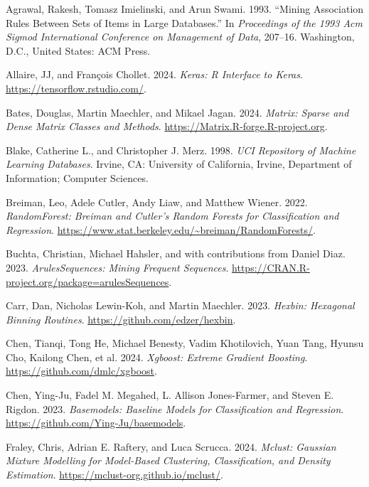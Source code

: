 \documentclass[
  notitlepage]{book}
\newlength{\cslhangindent}
\newenvironment{cslreferences}%
  {\setlength{\parindent}{0pt}%
  \everypar{\setlength{\hangindent}{\cslhangindent}}\ignorespaces}%
  {\par}
\begin{document}
\hypertarget{refs}{}
\begin{cslreferences}
\leavevmode\hypertarget{ref-arules:Agrawal+Imielinski+Swami:1993}{}%
Agrawal, Rakesh, Tomasz Imielinski, and Arun Swami. 1993. ``Mining Association Rules Between Sets of Items in Large Databases.'' In \emph{Proceedings of the 1993 Acm Sigmod International Conference on Management of Data}, 207--16. Washington, D.C., United States: ACM Press.

\leavevmode\hypertarget{ref-R-keras}{}%
Allaire, JJ, and François Chollet. 2024. \emph{Keras: R Interface to Keras}. \url{https://tensorflow.rstudio.com/}.

\leavevmode\hypertarget{ref-R-Matrix}{}%
Bates, Douglas, Martin Maechler, and Mikael Jagan. 2024. \emph{Matrix: Sparse and Dense Matrix Classes and Methods}. \url{https://Matrix.R-forge.R-project.org}.

\leavevmode\hypertarget{ref-mlbench1998}{}%
Blake, Catherine L., and Christopher J. Merz. 1998. \emph{UCI Repository of Machine Learning Databases}. Irvine, CA: University of California, Irvine, Department of Information; Computer Sciences.

\leavevmode\hypertarget{ref-R-randomForest}{}%
Breiman, Leo, Adele Cutler, Andy Liaw, and Matthew Wiener. 2022. \emph{RandomForest: Breiman and Cutler's Random Forests for Classification and Regression}. \url{https://www.stat.berkeley.edu/~breiman/RandomForests/}.

\leavevmode\hypertarget{ref-R-arulesSequences}{}%
Buchta, Christian, Michael Hahsler, and with contributions from Daniel Diaz. 2023. \emph{ArulesSequences: Mining Frequent Sequences}. \url{https://CRAN.R-project.org/package=arulesSequences}.

\leavevmode\hypertarget{ref-R-hexbin}{}%
Carr, Dan, Nicholas Lewin-Koh, and Martin Maechler. 2023. \emph{Hexbin: Hexagonal Binning Routines}. \url{https://github.com/edzer/hexbin}.

\leavevmode\hypertarget{ref-R-xgboost}{}%
Chen, Tianqi, Tong He, Michael Benesty, Vadim Khotilovich, Yuan Tang, Hyunsu Cho, Kailong Chen, et al. 2024. \emph{Xgboost: Extreme Gradient Boosting}. \url{https://github.com/dmlc/xgboost}.

\leavevmode\hypertarget{ref-R-basemodels}{}%
Chen, Ying-Ju, Fadel M. Megahed, L. Allison Jones-Farmer, and Steven E. Rigdon. 2023. \emph{Basemodels: Baseline Models for Classification and Regression}. \url{https://github.com/Ying-Ju/basemodels}.

\leavevmode\hypertarget{ref-R-mclust}{}%
Fraley, Chris, Adrian E. Raftery, and Luca Scrucca. 2024. \emph{Mclust: Gaussian Mixture Modelling for Model-Based Clustering, Classification, and Density Estimation}. \url{https://mclust-org.github.io/mclust/}.


\end{cslreferences}
\end{document}

